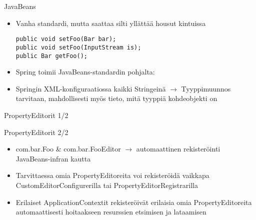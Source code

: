 \documentclass[hyperref={pdfauthor=\AUTHOR},14pt]{beamer}
\author{\AUTHOR}
\title[\TITLE]{\TITLE}
\date{\DATE}
\begin{document}
\begin{frame}[plain]
\titlepage
\end{frame}

\begin{frame}[t,fragile]{JavaBeans}
\begin{itemize}
\item Vanha standardi, mutta saattaa silti yllättää housut kintuissa

\begin{lstlisting}[style=Java]
public void setFoo(Bar bar);
public void setFoo(InputStream is);
public Bar getFoo();
\end{lstlisting}

\item Spring toimii JavaBeans-standardin pohjalta:

\item Springin XML-konfiguraatiossa kaikki Stringeinä $\rightarrow$
  Tyyppimuunnos tarvitaan, mahdollisesti myös tieto, mitä tyyppiä kohdeobjekti on
\end{itemize}
\end{frame}

\begin{frame}{PropertyEditorit 1/2}
\end{frame}

\begin{frame}{PropertyEditorit 2/2}
\begin{itemize}
\item com.bar.Foo & com.bar.FooEditor $\rightarrow$ automaattinen rekisteröinti
  JavaBeans-infran kautta
\item Tarvittaessa omia PropertyEditoreita voi rekisteröidä vaikkapa
  CustomEditorConfigurerilla tai PropertyEditorRegistrarilla
\item Erilaiset ApplicationContextit rekisteröivät erilaisia omia
  PropertyEditoreita automaattisesti hoitaakseen resurssien etsimisen
  ja lataamisen
\end{itemize}
\end{frame}
\end{document}
